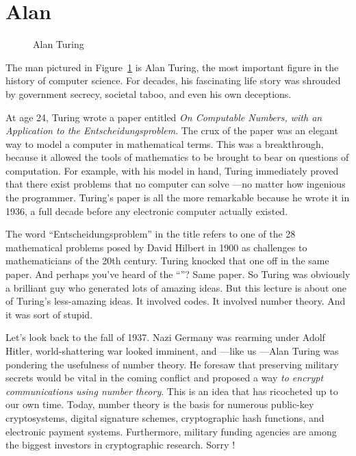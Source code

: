 \begin{problems}
\classproblems
{}

\homeworkproblems
{}

\end{problems}

\section{Alan }\label{Turing_sec}

\begin{figure}\redrawntrue
{}
\caption{Alan Turing}
\label{fig:Turing}
\end{figure}

The man pictured in Figure~\ref{fig:Turing} is Alan Turing, the most important figure in
the history of computer science.  For decades, his fascinating life story was shrouded by
government secrecy, societal taboo, and even his own deceptions.

At age 24, Turing wrote a paper entitled \emph{On Computable Numbers, with an Application
  to the Entscheidungsproblem}.  The crux of the paper was an elegant way to model a
computer in mathematical terms.  This was a breakthrough, because it allowed the tools of
mathematics to be brought to bear on questions of computation.  For example, with his model
in hand, Turing immediately proved that there exist problems that no computer can solve
---no matter how ingenious the programmer.  Turing's paper is all the more remarkable
because he wrote it in 1936, a full decade before any electronic computer actually existed.

The word ``Entscheidungsproblem'' in the title refers to one of the 28 mathematical
problems posed by David Hilbert in 1900 as challenges to mathematicians of the 20th
century.  Turing knocked that one off in the same paper.  And perhaps you've heard of the
``''?  Same paper.  So Turing was obviously a brilliant guy who
generated lots of amazing ideas.  But this lecture is about one of Turing's less-amazing
ideas.  It involved codes.  It involved number theory.  And it was sort of stupid.


Let's look back to the fall of 1937.  Nazi Germany was rearming under Adolf Hitler,
world-shattering war looked imminent, and ---like us ---Alan Turing was pondering the
usefulness of number theory.  He foresaw that preserving military secrets would be vital in
the coming conflict and proposed a way \emph{to encrypt communications using number
  theory}.  This is an idea that has ricocheted up to our own time.  Today, number theory
is the basis for numerous public-key cryptosystems, digital signature schemes,
cryptographic hash functions, and electronic payment systems.  Furthermore, military
funding agencies are among the biggest investors in cryptographic research.  Sorry
!

